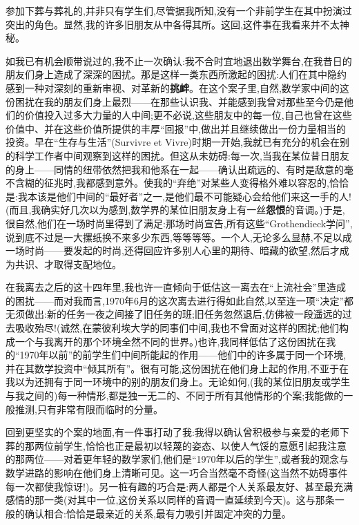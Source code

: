 参加下葬与葬礼的,并非只有学生们,尽管据我所知,没有一个非前学生在其中扮演过突出的角色。显然,我的许多旧朋友从中各得其所。这回,这件事在我看来并不太神秘。

\dmark{}如我已有机会顺带说过的,我不止一次确认:我不合时宜地退出数学舞台,在我昔日的朋友们身上造成了深深的困扰。那是这样一类东西所激起的困扰:人们在其中隐约感到一种对深刻的重新审视、对革新的\textbf{挑衅}。在这个案子里,自然,数学家中间的这份困扰在我的朋友们身上最烈——在那些认识我、并能感到我曾对那些至今仍是他们的价值投入过多大力量的人中间;更不必说,这些朋友中的每一位,自己也曾在这些价值中、并在这些价值所提供的丰厚“回报”中,做出并且继续做出一份力量相当的投资。早在“生存与生活”(Survivre et Vivre)时期一开始,我就已有充分的机会在别的科学工作者中间观察到这样的困扰。但这从未妨碍:每一次,当我在某位昔日朋友的身上——同情的纽带依然把我和他系在一起——确认出疏远的、有时是敌意的毫不含糊的征兆时,我都感到意外。使我的“弃绝”对某些人变得格外难以容忍的,恰恰是:我本该是他们中间的“最好者”之一,是他们最不可能疑心会给他们来这一手的人!(而且,我确实好几次以为感到,数学界的某位旧朋友身上有一丝\textbf{怨恨}的音调。)于是,很自然,他们在一场时尚里得到了满足:那场时尚宣告,所有这些“Grothendieck学问”,说到底不过是一大摞纸换不来多少东西,等等等等。一个人,无论多么显赫,不足以成一场时尚——要发起的时尚,还得回应许多别人心里的期待、暗藏的欲望,然后才成为共识、才取得支配地位。

在我离去之后的这十四年里,我也许一直倾向于低估这一离去在“上流社会”里造成的困扰——而对我而言,1970年6月的这次离去进行得如此自然,以至连一项“决定”都无须做出:新的任务一夜之间接了旧任务的班;旧任务忽然退后,仿佛被一段遥远的过去吸收殆尽!(诚然,在蒙彼利埃大学的同事们中间,我也不曾面对这样的困扰;他们构成一个与我离开的那个环境全然不同的世界。)也许,我同样低估了这份困扰在我的“1970年以前”的前学生们中间所能起的作用——他们中的许多属于同一个环境,并在其数学投资中“倾其所有”。很有可能\dmark{},这份困扰在他们身上起的作用,不亚于在我以为还拥有于同一环境中的别的朋友们身上。无论如何,(我的某位旧朋友或学生与我之间的)每一种情形,都是独一无二的、不同于所有其他情形的个案;我能做的一般推测,只有非常有限而临时的分量。

回到更坚实的个案的地面,有一件事打动了我:我得以确认曾积极参与亲爱的老师下葬的那两位前学生,恰恰也正是最初以轻蔑的姿态、以使人气馁的意愿引起我注意的那两位——对着更年轻的数学家们,他们是“1970年以后的学生”,或者我的观念与数学进路的影响在他们身上清晰可见。这一巧合当然毫不奇怪(这当然不妨碍事件每一次都使我惊讶!)。另一桩有趣的巧合是:两人都是个人关系最友好、甚至最充满感情的那一类(对其中一位,这份关系以同样的音调一直延续到今天)。这与那条一般的确认相合:恰恰是最亲近的关系,最有力吸引并固定冲突的力量。

